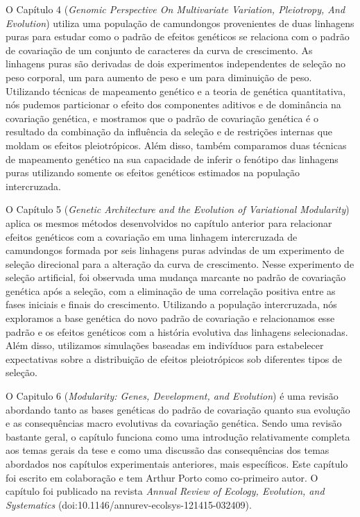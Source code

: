 \begin{refsection}
O Capítulo 4 (\textit{Genomic Perspective On Multivariate Variation,
Pleiotropy, And Evolution}) utiliza uma população de camundongos
provenientes de duas linhagens puras para estudar como o padrão de efeitos
genéticos se relaciona com o padrão de covariação de um conjunto de caracteres
da curva de crescimento. As linhagens puras são derivadas de dois experimentos
independentes de seleção no peso corporal, um para aumento de peso e um para
diminuição de peso. Utilizando técnicas de mapeamento genético e a teoria de
genética quantitativa, nós pudemos particionar o efeito dos
componentes aditivos e de dominância na covariação genética, e mostramos que o
padrão de covariação genética é o resultado da combinação da influência da
seleção e de restrições internas que moldam os efeitos pleiotrópicos. Além
disso, também comparamos duas técnicas de mapeamento genético na sua
capacidade de inferir o fenótipo das linhagens puras utilizando somente os
efeitos genéticos estimados na população intercruzada. 

O Capítulo 5 (\textit{Genetic Architecture and the Evolution of Variational
Modularity}) aplica os mesmos métodos desenvolvidos no capítulo anterior para
relacionar efeitos genéticos com a covariação em uma linhagem intercruzada de
camundongos formada por seis linhagens puras advindas de um experimento de
seleção direcional para a alteração da curva de crescimento. Nesse experimento
de seleção artificial, foi observada uma mudança marcante no padrão de
covariação genética após a seleção, com a eliminação de uma correlação
positiva entre as fases iniciais e finais do crescimento. Utilizando a
população intercruzada, nós exploramos a base genética do novo padrão de
covariação e relacionamos esse padrão e os efeitos genéticos com a história
evolutiva das linhagens selecionadas. Além disso, utilizamos simulações
baseadas em indivíduos para estabelecer expectativas sobre a distribuição de
efeitos pleiotrópicos sob diferentes tipos de seleção.

O Capitulo 6 (\textit{Modularity: Genes, Development, and Evolution}) é uma
revisão abordando tanto as bases genéticas do padrão de covariação quanto sua
evolução e as consequências macro evolutivas da covariação genética. Sendo uma
revisão bastante geral, o capítulo funciona como uma introdução relativamente
completa aos temas gerais da tese e como uma discussão das consequências dos
temas abordados nos capítulos experimentais anteriores, mais específicos. Este
capítulo foi escrito em colaboração e tem Arthur Porto como co-primeiro autor.
O capítulo foi publicado na revista \textit{Annual Review of Ecology,
Evolution, and Systematics} (doi:10.1146/annurev-ecolsys-121415-032409).


\printbibliography


\end{refsection}